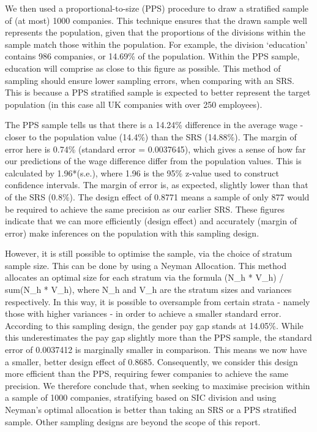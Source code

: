 \documentclass[]{article}
\begin{document}
We then used a proportional-to-size (PPS) procedure to draw a stratified
sample of (at most) 1000 companies. This technique ensures that the
drawn sample well represents the population, given that the proportions
of the divisions within the sample match those within the population.
For example, the division `education' contains 986 companies, or 14.69\%
of the population. Within the PPS sample, education will comprise as
close to this figure as possible. This method of sampling should ensure
lower sampling errors, when comparing with an SRS. This is because a PPS
stratified sample is expected to better represent the target population
(in this case all UK companies with over 250 employees).

The PPS sample tells us that there is a 14.24\% difference in the
average wage - closer to the population value (14.4\%) than the SRS
(14.88\%). The margin of error here is 0.74\% (standard error =
0.0037645), which gives a sense of how far our predictions of the wage
difference differ from the population values. This is calculated by
1.96*(s.e.), where 1.96 is the 95\% z-value used to construct confidence
intervals. The margin of error is, as expected, slightly lower than that
of the SRS (0.8\%). The design effect of 0.8771 means a sample of only
877 would be required to achieve the same precision as our earlier SRS.
These figures indicate that we can more efficiently (design effect) and
accurately (margin of error) make inferences on the population with this
sampling design.

However, it is still possible to optimise the sample, via the choice of
stratum sample size. This can be done by using a Neyman Allocation. This
method allocates an optimal size for each stratum via the formula (N\_h
* V\_h) / sum(N\_h * V\_h), where N\_h and V\_h are the stratum sizes
and variances respectively. In this way, it is possible to oversample
from certain strata - namely those with higher variances - in order to
achieve a smaller standard error. According to this sampling design, the
gender pay gap stands at 14.05\%. While this underestimates the pay gap
slightly more than the PPS sample, the standard error of 0.0037412 is
marginally smaller in comparison. This means we now have a smaller,
better design effect of 0.8685. Consequently, we consider this design
more efficient than the PPS, requiring fewer companies to achieve the
same precision. We therefore conclude that, when seeking to maximise
precision within a sample of 1000 companies, stratifying based on SIC
division and using Neyman's optimal allocation is better than taking an
SRS or a PPS stratified sample. Other sampling designs are beyond the
scope of this report.
\end{document}
